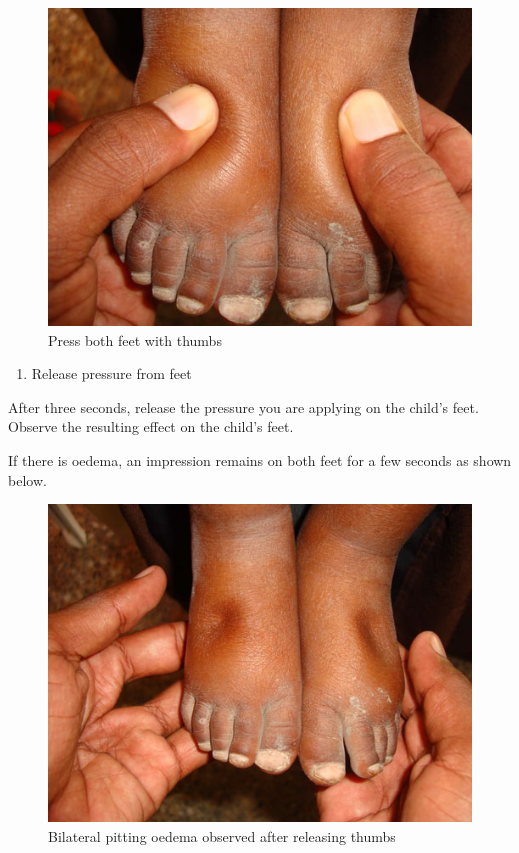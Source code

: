 \documentclass[12pt,]{book}
\providecommand{\tightlist}{%
  \setlength{\itemsep}{0pt}\setlength{\parskip}{0pt}}
\theoremstyle{definition}
\theoremstyle{definition}
\theoremstyle{definition}
\theoremstyle{remark}
\begin{document}
\begin{figure}

{\centering \includegraphics[width=6.94in]{images/oedemaStep1} 

}

\caption{Press both feet with thumbs}\label{fig:oedemaStep1}
\end{figure}

\begin{enumerate}
\def\labelenumi{\arabic{enumi}.}
\setcounter{enumi}{1}
\tightlist
\item
  Release pressure from feet
\end{enumerate}

After three seconds, release the pressure you are applying on the
child's feet. Observe the resulting effect on the child's feet.

If there is oedema, an impression remains on both feet for a few seconds
as shown below.

\begin{figure}

{\centering \includegraphics[width=6.94in]{images/oedemaStep2} 

}

\caption{Bilateral pitting oedema observed after releasing thumbs}\label{fig:oedemaStep2}
\end{figure}
\end{document}
